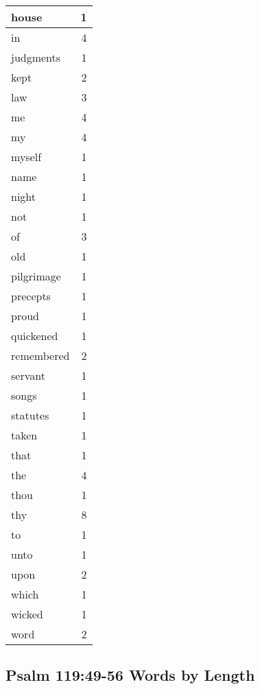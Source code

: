 \begin{center}
\begin{longtable}{l|r}
house & 1\\ \hline 
in & 4\\ \hline 
judgments & 1\\ \hline 
kept & 2\\ \hline 
law & 3\\ \hline 
me & 4\\ \hline 
my & 4\\ \hline 
myself & 1\\ \hline 
name & 1\\ \hline 
night & 1\\ \hline 
not & 1\\ \hline 
of & 3\\ \hline 
old & 1\\ \hline 
pilgrimage & 1\\ \hline 
precepts & 1\\ \hline 
proud & 1\\ \hline 
quickened & 1\\ \hline 
remembered & 2\\ \hline 
servant & 1\\ \hline 
songs & 1\\ \hline 
statutes & 1\\ \hline 
taken & 1\\ \hline 
that & 1\\ \hline 
the & 4\\ \hline 
thou & 1\\ \hline 
thy & 8\\ \hline 
to & 1\\ \hline 
unto & 1\\ \hline 
upon & 2\\ \hline 
which & 1\\ \hline 
wicked & 1\\ \hline 
word & 2\\ \hline 
\end{longtable}
\end{center}





\subsection{Psalm  119:49-56 Words by Length}


\normalsize
 
